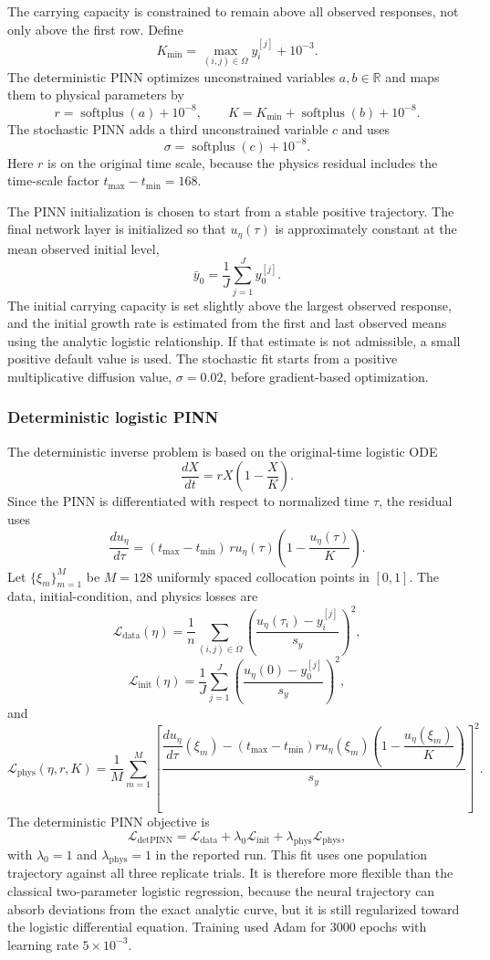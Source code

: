 \documentclass[11pt]{article}
\begin{document}
The carrying capacity is constrained to remain above all observed responses,
not only above the first row. Define
$$
  K_{\min}=\max_{(i,j)\in\Omega} y_i^{[j]}+10^{-3}.
$$
The deterministic PINN optimizes unconstrained variables $a,b\in\mathbb R$ and
maps them to physical parameters by
$$
  r=\operatorname{softplus}(a)+10^{-8},
  \qquad
  K=K_{\min}+\operatorname{softplus}(b)+10^{-8}.
$$
The stochastic PINN adds a third unconstrained variable $c$ and uses
$$
  \sigma=\operatorname{softplus}(c)+10^{-8}.
$$
Here $r$ is on the original time scale, because the physics residual includes
the time-scale factor $t_{\max}-t_{\min}=168$.

The PINN initialization is chosen to start from a stable positive trajectory.
The final network layer is initialized so that $u_\eta(\tau)$ is approximately
constant at the mean observed initial level,
$$
  \bar y_0=\frac{1}{J}\sum_{j=1}^J y_0^{[j]}.
$$
The initial carrying capacity is set slightly above the largest observed
response, and the initial growth rate is estimated from the first and last
observed means using the analytic logistic relationship. If that estimate is
not admissible, a small positive default value is used. The stochastic fit
starts from a positive multiplicative diffusion value, $\sigma=0.02$, before
gradient-based optimization.

\subsubsection{Deterministic logistic PINN}

The deterministic inverse problem is based on the original-time logistic ODE
$$
  \frac{dX}{dt}=rX\left(1-\frac{X}{K}\right).
$$
Since the PINN is differentiated with respect to normalized time $\tau$, the
residual uses
$$
  \frac{du_\eta}{d\tau}
  =
  (t_{\max}-t_{\min})\,
  r u_\eta(\tau)\left(1-\frac{u_\eta(\tau)}{K}\right).
$$
Let $\{\xi_m\}_{m=1}^M$ be $M=128$ uniformly spaced collocation points in
$[0,1]$. The data, initial-condition, and physics losses are
$$
  \mathcal L_{\mathrm{data}}(\eta)
  =
  \frac{1}{n}
  \sum_{(i,j)\in\Omega}
  \left(
    \frac{u_\eta(\tau_i)-y_i^{[j]}}{s_y}
  \right)^2,
$$
$$
  \mathcal L_{\mathrm{init}}(\eta)
  =
  \frac{1}{J}
  \sum_{j=1}^J
  \left(
    \frac{u_\eta(0)-y_0^{[j]}}{s_y}
  \right)^2,
$$
and
$$
  \mathcal L_{\mathrm{phys}}(\eta,r,K)
  =
  \frac{1}{M}
  \sum_{m=1}^M
  \left[
    \frac{
      \dfrac{du_\eta}{d\tau}(\xi_m)
      -
      (t_{\max}-t_{\min})r u_\eta(\xi_m)
      \left(1-\dfrac{u_\eta(\xi_m)}{K}\right)
    }{s_y}
  \right]^2 .
$$
The deterministic PINN objective is
$$
  \mathcal L_{\mathrm{detPINN}}
  =
  \mathcal L_{\mathrm{data}}
  +
  \lambda_0\mathcal L_{\mathrm{init}}
  +
  \lambda_{\mathrm{phys}}\mathcal L_{\mathrm{phys}},
$$
with $\lambda_0=1$ and $\lambda_{\mathrm{phys}}=1$ in the reported run. This
fit uses one population trajectory against all three replicate trials. It is
therefore more flexible than the classical two-parameter logistic regression,
because the neural trajectory can absorb deviations from the exact analytic
curve, but it is still regularized toward the logistic differential equation.
Training used Adam for 3000 epochs with learning rate $5\times10^{-3}$.
\end{document}
